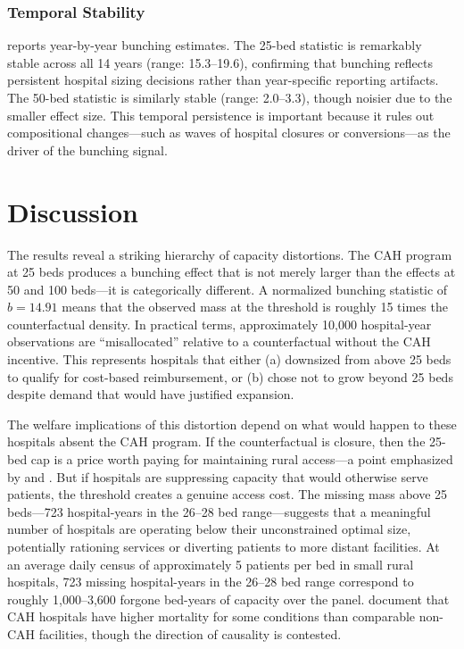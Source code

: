 \documentclass[12pt]{article}
\begin{document}


\subsubsection*{Temporal Stability}  reports year-by-year bunching estimates. The 25-bed statistic is remarkably stable across all 14 years (range: 15.3--19.6), confirming that bunching reflects persistent hospital sizing decisions rather than year-specific reporting artifacts. The 50-bed statistic is similarly stable (range: 2.0--3.3), though noisier due to the smaller effect size. This temporal persistence is important because it rules out compositional changes---such as waves of hospital closures or conversions---as the driver of the bunching signal.

\section{Discussion}

The results reveal a striking hierarchy of capacity distortions. The CAH program at 25 beds produces a bunching effect that is not merely larger than the effects at 50 and 100 beds---it is categorically different. A normalized bunching statistic of $b = 14.91$ means that the observed mass at the threshold is roughly 15 times the counterfactual density. In practical terms, approximately 10,000 hospital-year observations are ``misallocated'' relative to a counterfactual without the CAH incentive. This represents hospitals that either (a) downsized from above 25 beds to qualify for cost-based reimbursement, or (b) chose not to grow beyond 25 beds despite demand that would have justified expansion.

The welfare implications of this distortion depend on what would happen to these hospitals absent the CAH program. If the counterfactual is closure, then the 25-bed cap is a price worth paying for maintaining rural access---a point emphasized by \citet{Holmes2006} and \citet{Flex2020}. But if hospitals are suppressing capacity that would otherwise serve patients, the threshold creates a genuine access cost. The missing mass above 25 beds---723 hospital-years in the 26--28 bed range---suggests that a meaningful number of hospitals are operating below their unconstrained optimal size, potentially rationing services or diverting patients to more distant facilities. At an average daily census of approximately 5 patients per bed in small rural hospitals, 723 missing hospital-years in the 26--28 bed range correspond to roughly 1,000--3,600 forgone bed-years of capacity over the panel. \citet{Joynt2011} document that CAH hospitals have higher mortality for some conditions than comparable non-CAH facilities, though the direction of causality is contested.
\end{document}

